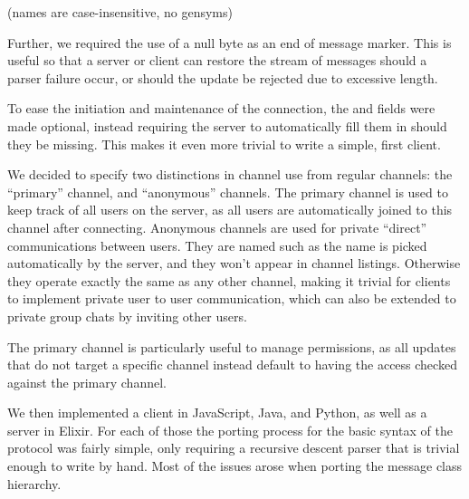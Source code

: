 \documentclass[format=sigconf]{acmart}
\begin{document}
\begin{step}
\item {}
  \begin{step}
  \item {}
  \item {}
  \end{step}
\item {} (names are case-insensitive, no gensyms)
  \begin{step}
  \item {}
  \item {}
  \end{step}
\item {}
\item {}
\end{step}

Further, we required the use of a null byte as an end of message marker. This is useful so that a server or client can restore the stream of messages should a parser failure occur, or should the update be rejected due to excessive length.

To ease the initiation and maintenance of the connection, the  and  fields were made optional, instead requiring the server to automatically fill them in should they be missing. This makes it even more trivial to write a simple, first client.

We decided to specify two distinctions in channel use from regular channels: the ``primary'' channel, and ``anonymous'' channels. The primary channel is used to keep track of all users on the server, as all users are automatically joined to this channel after connecting. Anonymous channels are used for private ``direct'' communications between users. They are named such as the name is picked automatically by the server, and they won't appear in channel listings. Otherwise they operate exactly the same as any other channel, making it trivial for clients to implement private user to user communication, which can also be extended to private group chats by inviting other users.

The primary channel is particularly useful to manage permissions, as all updates that do not target a specific channel instead default to having the access checked against the primary channel.

We then implemented a client in JavaScript, Java, and Python, as well as a server in Elixir. For each of those the porting process for the basic syntax of the protocol was fairly simple, only requiring a recursive descent parser that is trivial enough to write by hand. Most of the issues arose when porting the message class hierarchy.
\end{document}
